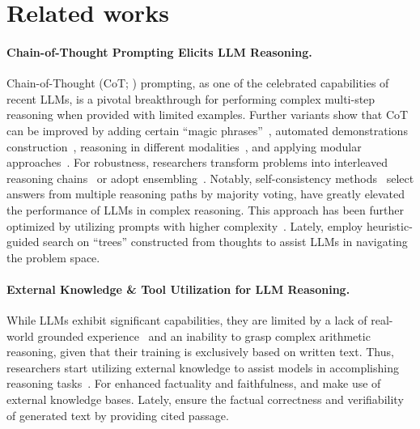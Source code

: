 \section{Related works}

\paragraph{Chain-of-Thought Prompting Elicits LLM Reasoning.}

Chain-of-Thought (CoT; \citealp{wei2022chain}) prompting, 
as one of the celebrated capabilities of recent LLMs, 
is a pivotal breakthrough for performing complex multi-step reasoning when provided with limited examples.
Further variants show that CoT can be improved by adding certain ``magic phrases''~\citep{kojima2022zscot}, 
automated demonstrations construction~\citep{zhang2022autocot}, 
reasoning in different modalities~\citep{zhang2023mmcot, yang2023mmreact, yao2023got},
and applying modular approaches~\citep{khot2023decomp}.
For robustness, 
researchers transform problems into interleaved reasoning chains~\citep{zhou2023leasttomost, lyu2023faithful} or adopt ensembling~\citep{wang2022rationale}. 
Notably,
self-consistency methods~\citep{wang2023sc} select answers from multiple reasoning paths by majority voting,
have greatly elevated the performance of LLMs in complex reasoning.
This approach has been further optimized by utilizing prompts with higher complexity~\citep{fu2023complexcot}.
Lately, 
\citet{yao2023tree} employ heuristic-guided search on ``trees'' constructed from thoughts to assist LLMs in navigating the problem space.

\paragraph{External Knowledge \& Tool Utilization for LLM Reasoning.} 
While LLMs exhibit significant capabilities, 
they are limited by a lack of real-world grounded experience~\citep{petroni2020how} and an inability to grasp complex arithmetic reasoning, 
given that their training is exclusively based on written text.
Thus, 
researchers start utilizing external knowledge to assist models in accomplishing reasoning tasks~\citep{nakano2022webgpt, schick2023toolformer}.
For enhanced factuality and faithfulness, 
\citet{he2022rethinking} and \citet{wang2023cok} make use of external knowledge bases.
Lately, 
\citet{gao2023enabling} ensure the factual correctness and verifiability of generated text by providing cited passage. %

